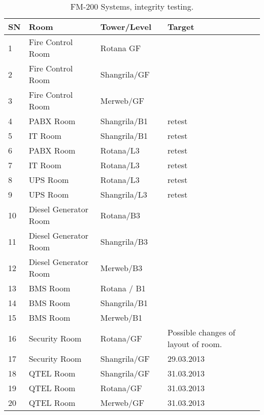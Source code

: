 \begin{table}[htbp]
\begin{tabular}{llllp{2.8cm}}
\toprule
SN	&Room 	      &Tower/Level	& \WIR &Target\\ 
\midrule
1	&Fire Control Room	  &Rotana GF	  &\ch&\\
2	&Fire Control Room	  &Shangrila/GF&\ch&\\
3	&Fire Control Room	  &Merweb/GF	&\ch&\\
\midrule
4	&PABX Room	      &Shangrila/B1	&\ch& retest\\
5	&IT Room	           &Shangrila/B1	  &\ch&retest\\
6	&PABX Room	      &Rotana/L3	    &\ch&retest\\
7	&IT Room	           &Rotana/L3	     &\ch&retest\\
\midrule
8	&UPS Room	            &Rotana/L3	     &\ch  &retest\\
9	&UPS Room	            &Shangrila/L3	&\ch  &retest\\
\midrule
10	&Diesel Generator Room	 &Rotana/B3	&\ch&\\
11	&Diesel Generator Room	&Shangrila/B3	 &\ch&\\
12	&Diesel Generator Room	&Merweb/B3	&\ch&\\
\midrule
13	&BMS Room	            &Rotana / B1	&\ch& \\
14	&BMS Room	            &Shangrila/B1	&\ch&\\
15	&BMS Room	            &Merweb/B1	&\ch&\\
\midrule
16	&Security Room	&Rotana/GF	&&\Danger Possible changes of layout of room. \\
17	&Security Room	&Shangrila/GF	&&29.03.2013 \\
\midrule
18	&QTEL Room	&Shangrila/GF	&& 31.03.2013\\
19	&QTEL Room	&Rotana/GF	&& 31.03.2013\\
20	&QTEL Room	&Merweb/GF	&& 31.03.2013\\
\bottomrule
\end{tabular}
\caption{FM-200 Systems, integrity testing.}
\label{FM-200}
\end{table}

%

